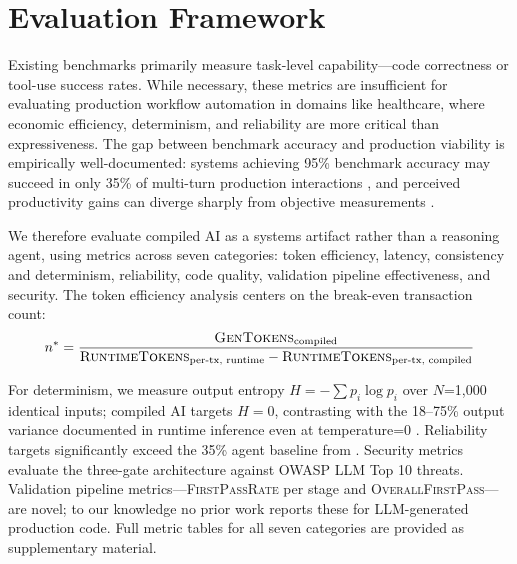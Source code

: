 \documentclass[11pt]{article}
\newcommand{\metric}[1]{\textsc{#1}}
\begin{document}
\section{Evaluation Framework}
\label{sec:framework}

Existing benchmarks primarily measure task-level capability---code correctness or tool-use success rates. While necessary, these metrics are insufficient for evaluating production workflow automation in domains like healthcare, where economic efficiency, determinism, and reliability are more critical than expressiveness. The gap between benchmark accuracy and production viability is empirically well-documented: systems achieving 95\% benchmark accuracy may succeed in only 35\% of multi-turn production interactions \citep{salesforce2025agents}, and perceived productivity gains can diverge sharply from objective measurements \citep{metr2025productivity}.

We therefore evaluate compiled AI as a systems artifact rather than a reasoning agent, using metrics across seven categories: token efficiency, latency, consistency and determinism, reliability, code quality, validation pipeline effectiveness, and security. The token efficiency analysis centers on the break-even transaction count:
\begin{equation}
n^* = \frac{\text{\metric{GenTokens}}_{\text{compiled}}}{\text{\metric{RuntimeTokens}}_{\text{per-tx, runtime}} - \text{\metric{RuntimeTokens}}_{\text{per-tx, compiled}}}
\end{equation}

For determinism, we measure output entropy $H = -\sum p_i \log p_i$ over $N$=1,000 identical inputs; compiled AI targets $H = 0$, contrasting with the 18--75\% output variance documented in runtime inference even at temperature=0 \citep{ouyang2023nondeterminism}. Reliability targets significantly exceed the 35\% agent baseline from \citet{salesforce2025agents}. Security metrics evaluate the three-gate architecture against OWASP LLM Top 10 threats. Validation pipeline metrics---\metric{FirstPassRate} per stage and \metric{OverallFirstPass}---are novel; to our knowledge no prior work reports these for LLM-generated production code. Full metric tables for all seven categories are provided as supplementary material.

\end{document}
